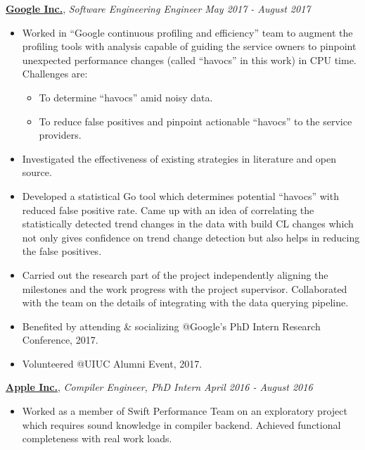 \documentclass[9pt]{article}
\newenvironment{changemargin}[2]{%
  \begin{list}{}{%
    \setlength{\topsep}{0pt}%
    \setlength{\leftmargin}{#1}%
    \setlength{\rightmargin}{#2}%
    \setlength{\listparindent}{\parindent}%
    \setlength{\itemindent}{\parindent}%
    \setlength{\parsep}{\parskip}%
  }%
  \item[]}{\end{list}
}
\newenvironment{body} {
	\vspace*{-16pt}
	\begin{changemargin}{-0.25in}{-0.5in}
  }	
	{\end{changemargin}
}
\begin{document}
\begin{body}
	\vspace{14pt}
	\href{https://www.google.com/intl/en/about/}{\textbf{Google Inc.}}, \emph{Software Engineering Engineer} \hfill \emph{May 2017 - August 2017}\\
	\vspace*{-4pt}
	\begin{itemize} \itemsep -0pt
		\item  Worked in ``Google continuous profiling and efficiency'' team to augment the
			profiling tools with analysis capable of
			guiding the service owners to pinpoint unexpected
			performance changes (called ``havocs'' in this work) in CPU time. Challenges are:
			\begin{itemize}
				\item To determine ``havocs'' amid noisy data.
				\item To reduce false positives and pinpoint actionable ``havocs'' to the service providers.
			\end{itemize}
		\item Investigated the effectiveness of existing strategies in literature and open source.
		\item
			Developed a statistical Go tool which determines
			potential ``havocs'' with reduced false positive rate.
			Came up with an idea of correlating the
			statistically detected trend changes in the data with
			build CL changes which not only gives confidence on
			trend change detection but also helps in reducing the
			false positives.

		\item Carried out the research part of the project
			independently aligning the milestones and the work
			progress with the project supervisor. Collaborated with
			the team on the details of integrating with the data
			querying pipeline.
		\item Benefited by attending \& socializing @Google's PhD Intern Research Conference, 2017.
		\item Volunteered @UIUC Alumni Event, 2017.
	\end{itemize}

	\vspace*{-4pt}
	\href{http://www.apple.com}{\textbf{Apple Inc.}}, \emph{Compiler Engineer, PhD Intern} \hfill \emph{April 2016 - August 2016}\\
	\vspace*{-4pt}
	\begin{itemize} \itemsep -0pt  %
                \item  Worked as a member of Swift Performance Team on an
                  exploratory project which requires sound knowledge in
                  compiler backend. Achieved functional completeness with real
                  work loads.
                \end{itemize}


\end{body}
\end{document}
